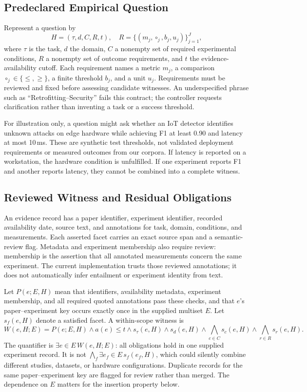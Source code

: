 \documentclass[runningheads]{llncs}
\begin{document}
\subsection{Predeclared Empirical Question}
Represent a question by
\begin{equation}
 H=(\tau,d,C,R,t),\quad R=\{(m_j,\circ_j,b_j,u_j)\}_{j=1}^{J},
\end{equation}
where $\tau$ is the task, $d$ the domain, $C$ a nonempty set of required experimental conditions, $R$ a nonempty set of outcome requirements, and $t$ the evidence-availability cutoff. Each requirement names a metric $m_j$, a comparison $\circ_j\in\{\leq,\geq\}$, a finite threshold $b_j$, and a unit $u_j$. Requirements must be reviewed and fixed before assessing candidate witnesses. An underspecified phrase such as ``Retrofitting--Security'' fails this contract; the controller requests clarification rather than inventing a task or a success threshold.

For illustration only, a question might ask whether an IoT detector identifies unknown attacks on edge hardware while achieving F1 at least 0.90 and latency at most 10\,ms. These are synthetic test thresholds, not validated deployment requirements or measured outcomes from our corpora. If latency is reported on a workstation, the hardware condition is unfulfilled. If one experiment reports F1 and another reports latency, they cannot be combined into a complete witness.

\subsection{Reviewed Witness and Residual Obligations}
An evidence record has a paper identifier, experiment identifier, recorded availability date, source text, and annotations for task, domain, conditions, and measurements. Each asserted facet carries an exact source span and a semantic-review flag. Metadata and experiment membership also require review: membership is the assertion that all annotated measurements concern the same experiment. The current implementation trusts those reviewed annotations; it does not automatically infer entailment or experiment identity from text.

Let $P(e;E,H)$ mean that identifiers, availability metadata, experiment membership, and all required quoted annotations pass these checks, and that $e$'s paper--experiment key occurs exactly once in the supplied multiset $E$. Let $s_f(e,H)$ denote a satisfied facet. A within-scope witness is
\begin{equation}
 W(e,H;E)=P(e;E,H)\land a(e)\leq t\land s_{\tau}(e,H)\land s_d(e,H)
 \land\bigwedge_{c\in C}s_c(e,H)\land\bigwedge_{r\in R}s_r(e,H).
\label{eq:witness}
\end{equation}
The quantifier is $\exists e\in E\,W(e,H;E)$: all obligations hold in one supplied experiment record. It is not $\bigwedge_f\exists e_f\in E\,s_f(e_f,H)$, which could silently combine different studies, datasets, or hardware configurations. Duplicate records for the same paper--experiment key are flagged for review rather than merged. The dependence on $E$ matters for the insertion property below.
\end{document}
